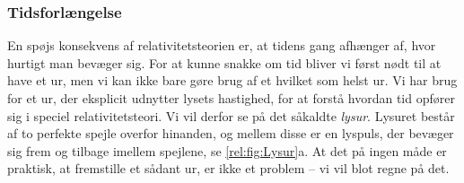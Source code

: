 \subsubsection{Tidsforlængelse} \label{rel:sec:Tidsforlaengelse}
En spøjs konsekvens af relativitetsteorien er, at tidens gang afhænger af, hvor hurtigt man bevæger sig. For at kunne snakke om tid bliver vi først nødt til at have et ur, men vi kan ikke bare gøre brug af et hvilket som helst ur. Vi har brug for et ur, der eksplicit udnytter lysets hastighed, for at forstå hvordan tid opfører sig i speciel relativitetsteori. Vi vil derfor se på det såkaldte \emph{lysur}. Lysuret består af to perfekte spejle overfor hinanden, og mellem disse er en lyspuls, der bevæger sig frem og tilbage imellem spejlene, se \cref{rel:fig:Lysur}a. At det på ingen måde er praktisk, at fremstille et sådant ur, er ikke et problem -- vi vil blot regne på det.

